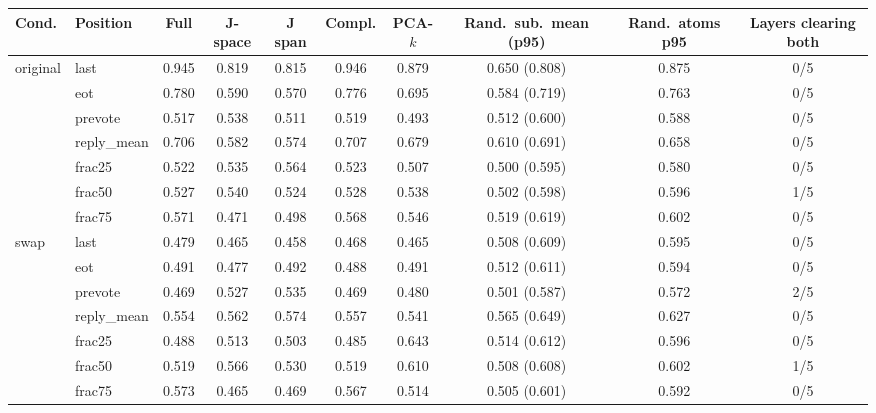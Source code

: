 \begin{tabular}{llcccccccc}\toprule
Cond. & Position & Full & J-space & J span & Compl. & PCA-$k$ & Rand.\ sub.\ mean (p95) & Rand.\ atoms p95 & Layers clearing both\\\midrule
original & last & 0.945 & 0.819 & 0.815 & 0.946 & 0.879 & 0.650 (0.808) & 0.875 & 0/5\\
 & eot & 0.780 & 0.590 & 0.570 & 0.776 & 0.695 & 0.584 (0.719) & 0.763 & 0/5\\
 & prevote & 0.517 & 0.538 & 0.511 & 0.519 & 0.493 & 0.512 (0.600) & 0.588 & 0/5\\
 & reply\_mean & 0.706 & 0.582 & 0.574 & 0.707 & 0.679 & 0.610 (0.691) & 0.658 & 0/5\\
 & frac25 & 0.522 & 0.535 & 0.564 & 0.523 & 0.507 & 0.500 (0.595) & 0.580 & 0/5\\
 & frac50 & 0.527 & 0.540 & 0.524 & 0.528 & 0.538 & 0.502 (0.598) & 0.596 & 1/5\\
 & frac75 & 0.571 & 0.471 & 0.498 & 0.568 & 0.546 & 0.519 (0.619) & 0.602 & 0/5\\
\midrule
swap & last & 0.479 & 0.465 & 0.458 & 0.468 & 0.465 & 0.508 (0.609) & 0.595 & 0/5\\
 & eot & 0.491 & 0.477 & 0.492 & 0.488 & 0.491 & 0.512 (0.611) & 0.594 & 0/5\\
 & prevote & 0.469 & 0.527 & 0.535 & 0.469 & 0.480 & 0.501 (0.587) & 0.572 & 2/5\\
 & reply\_mean & 0.554 & 0.562 & 0.574 & 0.557 & 0.541 & 0.565 (0.649) & 0.627 & 0/5\\
 & frac25 & 0.488 & 0.513 & 0.503 & 0.485 & 0.643 & 0.514 (0.612) & 0.596 & 0/5\\
 & frac50 & 0.519 & 0.566 & 0.530 & 0.519 & 0.610 & 0.508 (0.608) & 0.602 & 1/5\\
 & frac75 & 0.573 & 0.465 & 0.469 & 0.567 & 0.514 & 0.505 (0.601) & 0.592 & 0/5\\
\bottomrule\end{tabular}
